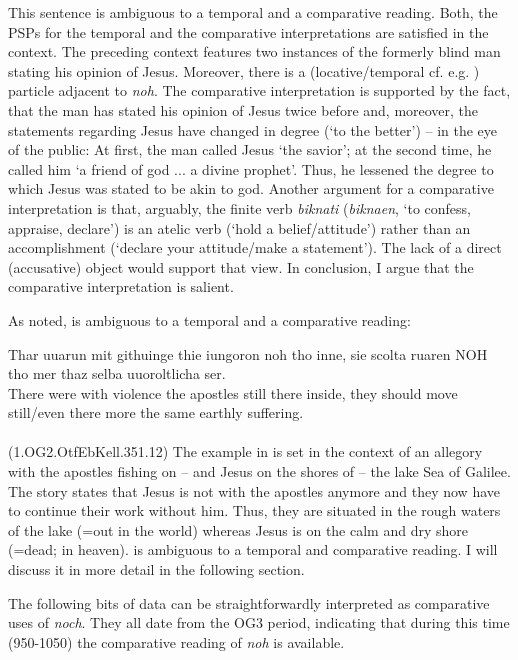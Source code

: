 \documentclass[output=paper,
modfonts
]{langscibook}
\begin{document}
This sentence is ambiguous to a temporal and a comparative reading. Both, the PSPs for the temporal and the comparative interpretations are satisfied in the context. The preceding context features two instances of the formerly blind man stating his opinion of Jesus. Moreover, there is a (locative/temporal cf. e.g. \citep{petrova2011}) particle adjacent to \textit{noh}. The comparative interpretation is supported by the fact, that the man has stated his opinion of Jesus twice before and, moreover, the statements regarding Jesus have changed in degree (`to the better') -- in the eye of the public: At first, the man called Jesus `the savior'; at the second time, he called him `a friend of god ... a divine prophet'. Thus, he lessened the degree to which Jesus was stated to be akin to god. Another argument for a comparative interpretation is that, arguably, the finite verb \textit{biknati} (\textit{biknaen}, `to confess, appraise, declare') is an atelic verb (`hold a belief/attitude') rather than an accomplishment (`declare your attitude/make a statement'). The lack of a direct (accusative) object would support that view. In conclusion, I argue that the comparative interpretation is salient.

As noted,  is ambiguous to a temporal and a comparative reading:

\ea\gll Thar uuarun mit githuinge thie iungoron noh tho inne, sie scolta ruaren NOH tho mer thaz selba uuoroltlicha ser.\\
       There were with violence the apostles still there inside, they should move still/even there more the same earthly suffering.\\
\label{OG2_noch_mehr_ruehren_first} \\  (1.OG2.OtfEbKell.351.12)
\z
The example in  is set in the context of an allegory with the apostles fishing on -- and Jesus on the shores of -- the lake Sea of Galilee. The story states that Jesus is not with the apostles anymore and they now have to continue their work without him. Thus, they are situated in the rough waters of the lake (=out in the world) whereas Jesus is on the calm and dry shore (=dead; in heaven).  is ambiguous to a temporal and comparative reading. I will discuss it in more detail in the following section.

The following bits of data can be straightforwardly interpreted as comparative uses of \textit{noch}. They all date from the OG3 period, indicating that during this time (950-1050) the comparative reading of \textit{noh} is available.
\end{document}
